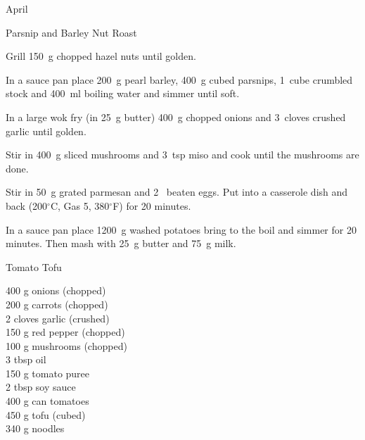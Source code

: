 \begin{menu}{April}
\begin{recipe}{2}{Parsnip and Barley Nut Roast}
\begin{ingredients}
		\end{ingredients}
	
	
    \begin{instructions}
    \item 
        Grill 150~g chopped hazel nuts until golden.
      \item 
        In a sauce pan
        place
        200~g  pearl barley,
        400~g cubed parsnips,
        1~cube crumbled stock
        and
        400~ml  boiling water
        and simmer until soft.
      \item 
        In a large wok fry
        (in 25~g  butter)
        400~g chopped onions
        and
        3~cloves crushed garlic
        until golden.
      \item 
        Stir in
        400~g sliced mushrooms
        and
        3~tsp  miso
        and cook until the mushrooms are done.
      \item 
        Stir in
        50~g grated parmesan
        and
        2~ beaten eggs.
        Put into a
        casserole dish
        and back
        (200$^{\circ}$C, Gas 5, 380$^{\circ}$F)
        for 20 minutes.
      \item 
    In a sauce pan place
    1200~g washed potatoes
    bring to the boil and simmer for 20 minutes.
    Then mash with
    25~g  butter
    and
    75~g  milk.
  
    \end{instructions}
    \end{recipe}%
  
    \begin{recipe}{2}{Tomato Tofu}%
		\begin{ingredients}
		400 g onions (chopped) \\
	200 g carrots (chopped) \\
	2 cloves garlic (crushed) \\
	150 g red pepper (chopped) \\
	100 g mushrooms (chopped) \\
	3 tbsp oil  \\
	150 g tomato puree  \\
	2 tbsp soy sauce  \\
	400 g can tomatoes  \\
	450 g tofu (cubed) \\
	340 g noodles  \\
	
		\end{ingredients}
	

\end{recipe}
\end{menu}
